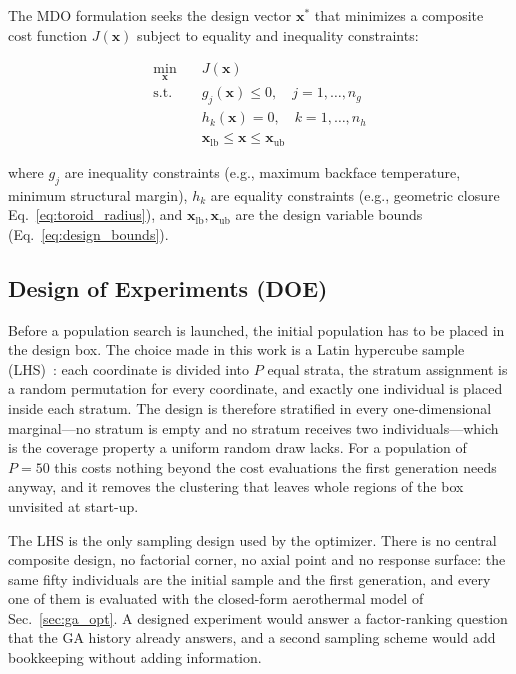 \noindent The MDO formulation seeks the design vector $\mathbf{x}^*$ that minimizes a composite cost function $J(\mathbf{x})$ subject to equality and inequality constraints:

\begin{equation}
    \begin{aligned}
        \min_{\mathbf{x}} \quad & J(\mathbf{x}) \\
        \text{s.t.} \quad & g_j(\mathbf{x}) \leq 0, \quad j = 1, \ldots, n_g \\
        & h_k(\mathbf{x}) = 0, \quad k = 1, \ldots, n_h \\
        & \mathbf{x}_{\text{lb}} \leq \mathbf{x} \leq \mathbf{x}_{\text{ub}}
    \end{aligned}
    \label{eq:mdo_formulation}
\end{equation}

\noindent where $g_j$ are inequality constraints (e.g., maximum backface temperature, minimum structural margin), $h_k$ are equality constraints (e.g., geometric closure Eq.~\ref{eq:toroid_radius}), and $\mathbf{x}_{\text{lb}}, \mathbf{x}_{\text{ub}}$ are the design variable bounds (Eq.~\ref{eq:design_bounds}).

\subsection{Design of Experiments (DOE)}

Before a population search is launched, the initial population has to be placed in the design box. The choice made in this work is a Latin hypercube sample (LHS)~\cite{mckay1979lhs}: each coordinate is divided into $P$ equal strata, the stratum assignment is a random permutation for every coordinate, and exactly one individual is placed inside each stratum. The design is therefore stratified in every one-dimensional marginal---no stratum is empty and no stratum receives two individuals---which is the coverage property a uniform random draw lacks. For a population of $P=50$ this costs nothing beyond the cost evaluations the first generation needs anyway, and it removes the clustering that leaves whole regions of the box unvisited at start-up.

The LHS is the only sampling design used by the optimizer. There is no central composite design, no factorial corner, no axial point and no response surface: the same fifty individuals are the initial sample and the first generation, and every one of them is evaluated with the closed-form aerothermal model of Sec.~\ref{sec:ga_opt}. A designed experiment would answer a factor-ranking question that the GA history already answers, and a second sampling scheme would add bookkeeping without adding information.

